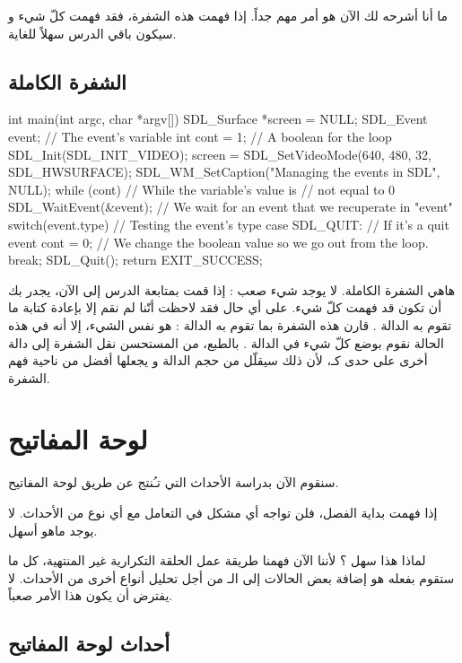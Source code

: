 ما أنا أشرحه لك الآن هو أمر مهم جداً. إذا فهمت هذه الشفرة، فقد فهمت كلّ شيء و سيكون باقي الدرس سهلاً للغاية.

\subsection{الشفرة الكاملة}

\begin{Csource}
int main(int argc, char *argv[])
{
	SDL_Surface *screen = NULL;
	SDL_Event event; // The event's variable
	int cont = 1; // A boolean for the loop
	SDL_Init(SDL_INIT_VIDEO);
	screen = SDL_SetVideoMode(640, 480, 32, SDL_HWSURFACE);
	SDL_WM_SetCaption("Managing the events in SDL", NULL);
	while (cont) // While the variable's value is 
	{            // not equal to 0
		SDL_WaitEvent(&event); // We wait for an event that we recuperate in "event"
		switch(event.type) // Testing the event's type
		{
			case SDL_QUIT: // If it's a quit event
			cont = 0; // We change the boolean value so we go out from the loop.
			break;
		}
	}
	SDL_Quit();
	return EXIT_SUCCESS;
}
\end{Csource}

هاهي الشفرة الكاملة. لا يوجد شيء صعب : إذا قمت بمتابعة الدرس إلى الآن، يجدر بك أن تكون قد فهمت كلّ شيء. على أي حال فقد لاحظت أنّنا لم نقم إلا بإعادة كتابة ما تقوم به الدالة 
.
قارن هذه الشفرة بما تقوم به الدالة
 :
هو نفس الشيء، إلا أنه في هذه الحالة نقوم بوضع كلّ شيء في الدالة
.
بالطبع، من المستحسن نقل الشفرة إلى دالة أخرى على حدى كـ،
لأن ذلك سيقلّل من حجم الدالة
و يجعلها أفضل من ناحية فهم الشفرة.

\section{لوحة المفاتيح}

سنقوم الآن بدراسة الأحداث التي تـُنتج عن طريق لوحة المفاتيح.

إذا فهمت بداية الفصل، فلن تواجه أي مشكل في التعامل مع أي نوع من الأحداث. لا يوجد ماهو أسهل.

لماذا هذا سهل ؟ لأننا الآن فهمنا طريقة عمل الحلقة التكرارية غير المنتهية، كل ما ستقوم بفعله هو إضافة بعض الحالات إلى الـ
من أجل تحليل أنواع أخرى من الأحداث. لا يفترض أن يكون هذا الأمر صعباً.

\subsection{أحداث لوحة المفاتيح}

